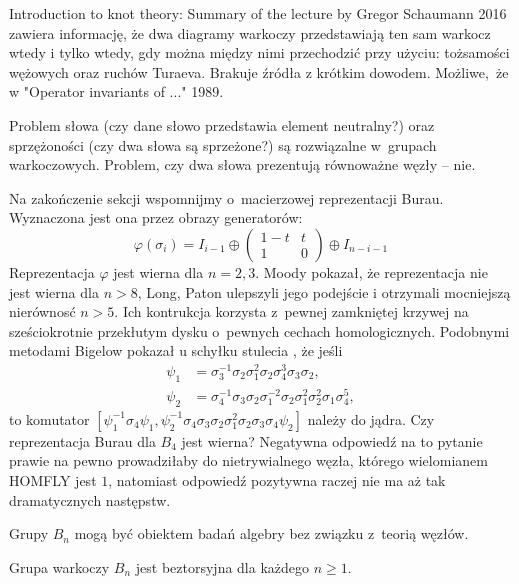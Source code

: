 \begin{tobedone}
    Introduction to knot theory: Summary of the lecture by Gregor Schaumann 2016 zawiera informację, że dwa diagramy warkoczy przedstawiają ten sam warkocz wtedy i tylko wtedy, gdy można między nimi przechodzić przy użyciu: tożsamości wężowych oraz ruchów Turaeva.
    Brakuje źródła z krótkim dowodem.
    Możliwe, że w "Operator invariants of ..." 1989.
\end{tobedone}

Problem słowa (czy dane słowo przedstawia element neutralny?) oraz sprzężoności (czy dwa słowa są sprzeżone?) są rozwiązalne w~grupach warkoczowych.
Problem, czy dwa słowa prezentują równoważne węzły -- nie.

Na zakończenie sekcji wspomnijmy o~macierzowej reprezentacji Burau.
Wyznaczona jest ona przez obrazy generatorów:
\begin{equation}
    \varphi(\sigma_i) = I_{i-1} \oplus \begin{pmatrix}
        1-t & t \\
        1   & 0
    \end{pmatrix} \oplus I_{n-i-1}
\end{equation}
Reprezentacja $\varphi$ jest wierna dla $n = 2, 3$.
Moody pokazał, że reprezentacja nie jest wierna dla $n > 8$, Long, Paton ulepszyli jego podejście i otrzymali mocniejszą nierównosć $n > 5$.
Ich kontrukcja korzysta z~pewnej zamkniętej krzywej na sześciokrotnie przekłutym dysku o~pewnych cechach homologicznych.
Podobnymi metodami Bigelow pokazał u schyłku stulecia \cite{bigelow99}, że jeśli
\begin{align}
    \psi_1 & = \sigma_3^{{-1}}\sigma_2\sigma_1^2\sigma_2\sigma_4^3\sigma_3\sigma_2, \\
\psi_2 & = \sigma_4^{{-1}}\sigma_3\sigma_2\sigma_1^{{-2}}\sigma_2\sigma_1^2\sigma_2^2\sigma_1\sigma_4^5,
\end{align}
to komutator $[\psi_1^{{-1}}\sigma_4\psi_1,\psi_2^{{-1}}\sigma_4\sigma_3\sigma_2\sigma_1^2\sigma_2\sigma_3\sigma_4\psi_2]$ należy do jądra.
Czy reprezentacja Burau dla $B_4$ jest wierna?
Negatywna odpowiedź na to pytanie prawie na pewno prowadziłaby do
nietrywialnego węzła, którego wielomianem HOMFLY jest $1$,
natomiast odpowiedź pozytywna raczej nie ma aż tak dramatycznych następstw.

Grupy $B_n$ mogą być obiektem badań algebry bez związku z~teorią węzłów.

\begin{proposition}
    Grupa warkoczy $B_n$ jest beztorsyjna dla każdego $n \ge 1$.
\end{proposition}

